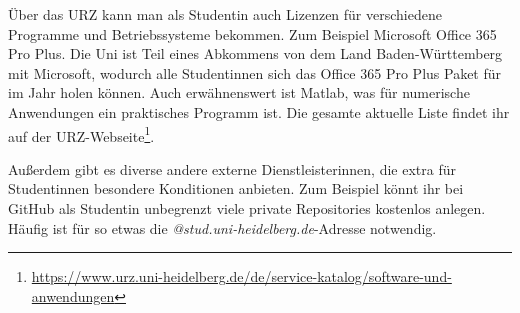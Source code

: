 Über das URZ kann man als Studentin auch Lizenzen für verschiedene Programme und Betriebssysteme bekommen. Zum Beispiel Microsoft Office 365 Pro Plus. Die Uni ist Teil eines Abkommens von dem Land Baden-Württemberg mit Microsoft, wodurch alle Studentinnen sich das Office 365 Pro Plus Paket für  im Jahr holen können. Auch erwähnenswert ist Matlab, was für numerische Anwendungen ein praktisches Programm ist. Die gesamte aktuelle Liste findet ihr auf der URZ-Webseite\footnote{\url{https://www.urz.uni-heidelberg.de/de/service-katalog/software-und-anwendungen}}.

Außerdem gibt es diverse andere externe Dienstleisterinnen, die extra für Studentinnen besondere Konditionen anbieten. Zum Beispiel könnt ihr bei GitHub als Studentin unbegrenzt viele private Repositories kostenlos anlegen. Häufig ist für so etwas die \emph{@stud.uni-heidelberg.de}-Adresse notwendig.
